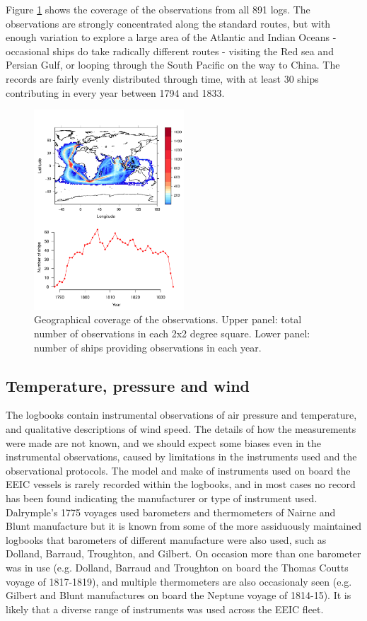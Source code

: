 \documentclass[CP]{copernicus}
\begin{document}
Figure \ref{Fsroc1} shows the coverage of the observations from all 891 logs. The observations are strongly concentrated along the standard routes, but with enough variation to explore a large area of the Atlantic and Indian Oceans - occasional ships do take radically different routes - visiting the Red sea and Persian Gulf, or looping through the South Pacific on the way to China. The records are fairly evenly distributed through time, with at least 30 ships contributing in every year between 1794 and 1833.
\begin{figure}[!hbp]
\begin{center}
\includegraphics[angle=0, width=0.5\textwidth]{../figures/coverage}
\caption{Geographical coverage of the observations. Upper panel: total number of observations in each 2x2 degree square. Lower panel: number of ships providing observations in each year.}
\label{Fsroc1}
\end{center}
\end{figure}

\subsection{Temperature, pressure and wind}

The logbooks contain instrumental observations of air pressure and temperature, and qualitative descriptions of wind speed. The details of how the measurements were made are not known, and we should expect some biases even in the instrumental observations, caused by limitations in the instruments used and the observational protocols. The model and make of instruments used on board the EEIC vessels is rarely recorded within the logbooks, and in most cases no record has been found indicating the manufacturer or type of instrument used. Dalrymple's 1775 voyages used barometers and thermometers of Nairne and Blunt manufacture \citep{Dalrymple78} but it is known from some of the more assiduously maintained logbooks that barometers of different manufacture were also used, such as Dolland, Barraud, Troughton, and Gilbert. On occasion more than one barometer was in use (e.g. Dolland, Barraud and Troughton on board the Thomas Coutts voyage of 1817-1819), and multiple thermometers are also occasionaly seen (e.g. Gilbert and Blunt manufactures on board the Neptune voyage of 1814-15). It is likely that a diverse range of instruments was used across the EEIC fleet.
\end{document}

